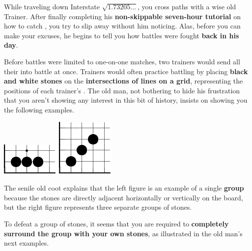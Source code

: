 

While traveling down Interstate \(\sqrt{1.73205...}\),
you cross paths with a wise old \mappMobimon{} Trainer. After finally
completing his
\textbf{non-skippable seven-hour tutorial} on how to catch \mappMobimon{},
you try to slip away without him noticing. Alas, before you can make your
excuses, he begins to tell you how \mappMobimon{} battles were fought
\textbf{back in his day}.

Before \mappMobimon{} battles were limited to one-on-one matches,
two trainers would send all their \mappMobimon{} into battle at once. Trainers
would often practice battling by placing \textbf{black and white stones}
on the \textbf{intersections of lines on a grid}, representing the positions
of each trainer's \mappMobimon{}. The old man,
not bothering to hide his frustration that you aren't showing any
interest in this bit of history, insists on showing you the following examples.

\begin{center}
  \includegraphics{gogetem/assets/explanation1-crop}
  \includegraphics{gogetem/assets/explanation2-crop}
\end{center}

The senile old coot explains that the left figure is an example of a single
\textbf{group} because the stones are directly adjacent horizontally
or vertically on the board, but the right figure represents
three separate groups of stones.

To defeat a group of stones, it seems that you are required to
\textbf{completely surround the group with your own stones}, as illustrated
in the old man's next examples.

